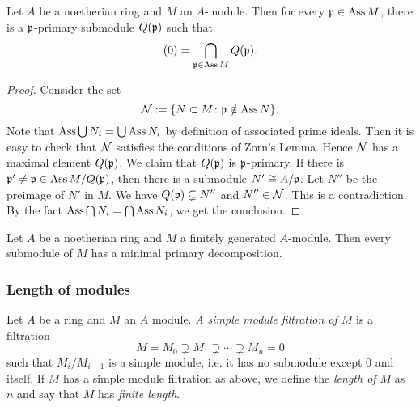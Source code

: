         \begin{theorem}\label{thm: primary decomposition for general module}
            Let $A$ be a noetherian ring and $M$ an $A$-module.
            Then for every ${\mathfrak{p}} \in \operatorname{Ass} M$, there is a ${\mathfrak{p}}$-primary submodule $Q({\mathfrak{p}})$ such that 
            \[ (0) = \bigcap_{{\mathfrak{p}} \in \operatorname{Ass} M} Q({\mathfrak{p}}). \] 
        \end{theorem}
        \begin{proof}
            Consider the set 
            \[ {\mathcal{N}}:= \{N \subset M \colon {\mathfrak{p}} \notin \operatorname{Ass} N \}. \]
            Note that $\operatorname{Ass} \bigcup N_i = \bigcup \operatorname{Ass} N_i$ by definition of associated prime ideals.
            Then it is easy to check that ${\mathcal{N}}$ satisfies the conditions of Zorn's Lemma.
            Hence ${\mathcal{N}}$ has a maximal element $Q({\mathfrak{p}})$.
            We claim that $Q({\mathfrak{p}})$ is ${\mathfrak{p}}$-primary.
            If there is ${\mathfrak{p}}' \neq {\mathfrak{p}} \in \operatorname{Ass} M/Q({\mathfrak{p}})$, then there is a submodule $N' \cong A/{\mathfrak{p}}$.
            Let $N''$ be the preimage of $N'$ in $M$.
            We have $Q({\mathfrak{p}}) \subsetneq N''$ and $N'' \in {\mathcal{N}}$.
            This is a contradiction.
            By the fact $\operatorname{Ass} \bigcap N_i = \bigcap \operatorname{Ass} N_i$, we get the conclusion.
        \end{proof}

        \begin{corollary}\label{cor: primary decomposition for finitely generated module}
            Let $A$ be a noetherian ring and $M$ a finitely generated $A$-module.
            Then every submodule of $M$ has a minimal primary decomposition.
        \end{corollary}


    \subsubsection{Length of modules}

        \begin{definition}\label{def: length of a module}
            Let $A$ be a ring and $M$ an $A$ module.
            \textit{A simple module filtration of $M$} is a filtration
            \[ M = M_0 \supsetneq M_1 \supsetneq \cdots \supsetneq M_n = 0 \] 
            such that $M_i/M_{i-1}$ is a simple module, i.e. it has no submodule except $0$ and itself.
            If $M$ has a simple module filtration as above, we define the \textit{length of $M$} as $n$ and say that $M$ has \textit{finite length}.
        \end{definition}


